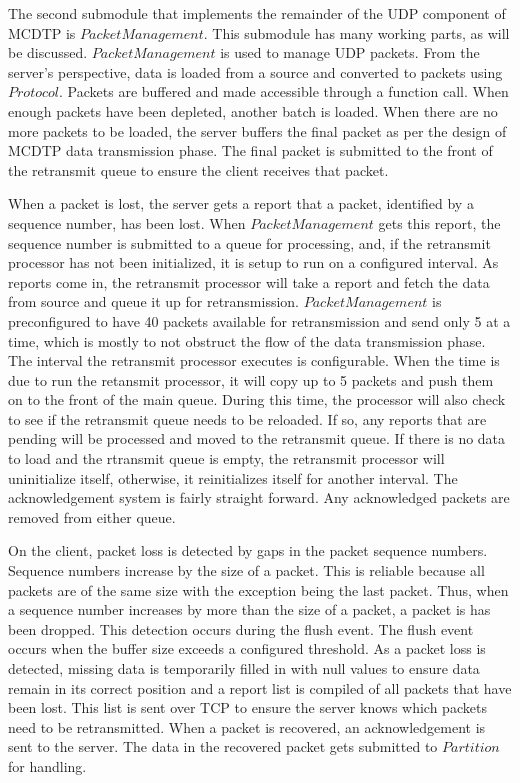 The second submodule that implements the remainder of the UDP component of MCDTP is $PacketManagement$. This submodule has many working parts, as will be discussed. $PacketManagement$ is used to manage UDP packets. From the server's perspective, data is loaded from a source and converted to packets using $Protocol$. Packets are buffered and made accessible through a function call. When enough packets have been depleted, another batch is loaded. When there are no more packets to be loaded, the server buffers the final packet as per the design of MCDTP data transmission phase. The final packet is submitted to the front of the retransmit queue to ensure the client receives that packet.

When a packet is lost, the server gets a report that a packet, identified by a sequence number, has been lost. When $PacketManagement$ gets this report, the sequence number is submitted to a queue for processing, and, if the retransmit processor has not been initialized, it is setup to run on a configured interval. As reports come in, the retransmit processor will take a report and fetch the data from source and queue it up for retransmission. $PacketManagement$ is preconfigured to have 40 packets available for retransmission and send only 5 at a time, which is mostly to not obstruct the flow of the data transmission phase. The interval the retransmit processor executes is configurable. When the time is due to run the retansmit processor, it will copy up to 5 packets and push them on to the front of the main queue. During this time, the processor will also check to see if the retransmit queue needs to be reloaded. If so, any reports that are pending will be processed and moved to the retransmit queue. If there is no data to load and the rtransmit queue is empty, the retransmit processor will uninitialize itself, otherwise, it reinitializes itself for another interval. The acknowledgement system is fairly straight forward. Any acknowledged packets are removed from either queue.

On the client, packet loss is detected by gaps in the packet sequence numbers. Sequence numbers increase by the size of a packet. This is reliable because all packets are of the same size with the exception being the last packet. Thus, when a sequence number increases by more than the size of a packet, a packet is has been dropped. This detection occurs during the flush event. The flush event occurs when the buffer size exceeds a configured threshold. As a packet loss is detected, missing data is temporarily filled in with null values to ensure data remain in its correct position and a report list is compiled of all packets that have been lost. This list is sent over TCP to ensure the server knows which packets need to be retransmitted. When a packet is recovered, an acknowledgement is sent to the server. The data in the recovered packet gets submitted to $Partition$ for handling.

